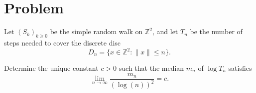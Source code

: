 \documentclass[11pt]{article}
\begin{document}
\section*{Problem}
Let $(S_k)_{k \geq 0}$ be the simple random walk on $\mathbb{Z}^2$, and let $T_n$ be the number of steps needed to cover the discrete disc
\[
D_n=\{x \in \mathbb{Z}^2 : \|x\| \leq n\}.
\]

Determine the unique constant $c > 0$ such that the median $m_n$ of $\log T_n$ satisfies
\[
\lim _{n \rightarrow \infty} \frac{m_n}{(\log(n))^2} = c.
\]
\end{document}
